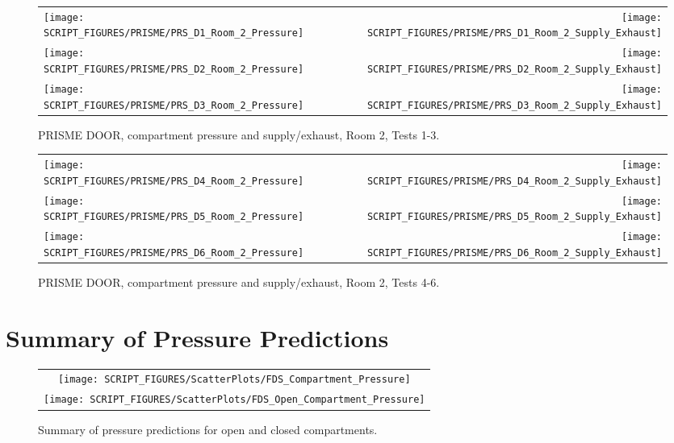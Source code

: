 \begin{figure}[p]
\begin{tabular*}{\textwidth}{l@{\extracolsep{\fill}}r}
\texttt{[image: SCRIPT\_FIGURES/PRISME/PRS\_D1\_Room\_2\_Pressure]} &
\texttt{[image: SCRIPT\_FIGURES/PRISME/PRS\_D1\_Room\_2\_Supply\_Exhaust]} \\
\texttt{[image: SCRIPT\_FIGURES/PRISME/PRS\_D2\_Room\_2\_Pressure]} &
\texttt{[image: SCRIPT\_FIGURES/PRISME/PRS\_D2\_Room\_2\_Supply\_Exhaust]} \\
\texttt{[image: SCRIPT\_FIGURES/PRISME/PRS\_D3\_Room\_2\_Pressure]} &
\texttt{[image: SCRIPT\_FIGURES/PRISME/PRS\_D3\_Room\_2\_Supply\_Exhaust]}
\end{tabular*}
\caption{PRISME DOOR, compartment pressure and supply/exhaust, Room 2, Tests 1-3.}
\label{PRISME_Room_2_Pressure_1-3}
\end{figure}

\begin{figure}[p]
\begin{tabular*}{\textwidth}{l@{\extracolsep{\fill}}r}
\texttt{[image: SCRIPT\_FIGURES/PRISME/PRS\_D4\_Room\_2\_Pressure]} &
\texttt{[image: SCRIPT\_FIGURES/PRISME/PRS\_D4\_Room\_2\_Supply\_Exhaust]} \\
\texttt{[image: SCRIPT\_FIGURES/PRISME/PRS\_D5\_Room\_2\_Pressure]} &
\texttt{[image: SCRIPT\_FIGURES/PRISME/PRS\_D5\_Room\_2\_Supply\_Exhaust]} \\
\texttt{[image: SCRIPT\_FIGURES/PRISME/PRS\_D6\_Room\_2\_Pressure]} &
\texttt{[image: SCRIPT\_FIGURES/PRISME/PRS\_D6\_Room\_2\_Supply\_Exhaust]}
\end{tabular*}
\caption{PRISME DOOR, compartment pressure and supply/exhaust, Room 2, Tests 4-6.}
\label{PRISME_Room_2_Pressure_4-6}
\end{figure}


\clearpage

\section{Summary of Pressure Predictions}
\label{Compartment Over-Pressure}
\label{Open Compartment Over-Pressure}


\begin{figure}[h!]
\begin{center}
\begin{tabular}{c}
\texttt{[image: SCRIPT\_FIGURES/ScatterPlots/FDS\_Compartment\_Pressure]} \\
\texttt{[image: SCRIPT\_FIGURES/ScatterPlots/FDS\_Open\_Compartment\_Pressure]}
\end{tabular}
\end{center}
\caption[Summary of pressure predictions]{Summary of pressure predictions for open and closed compartments.}
\label{Pressure_Summary}
\end{figure}

